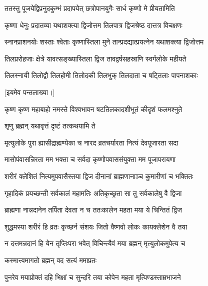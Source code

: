 \twolineshloka
{ततस्तु पूजयेद्विप्रनुदकुम्भं प्रदापयेत्}
{छत्रोपानयुगैः सार्ध कृष्णो मे प्रीयतामिति} %

\twolineshloka
{कृष्णा धेनुः प्रदातव्या यथाशक्त्या द्विजोत्तम}
{तिलपात्र द्विजश्रेष्ठ दात्तत्र विचक्षणः} %

\twolineshloka
{स्नानप्राशनयोः शस्ताः श्वेताः कृष्णास्तिला मुने}
{तान्प्रदद्यात्प्रयत्नेन यथाशक्त्या द्विजोत्तम} %

\twolineshloka
{तिलप्ररोहजाः क्षेत्रे यावत्सङ्ख्यास्तिला द्विज}
{तावद्वर्षसहस्राणि स्वर्गलोके महीयते} %

\twolineshloka
{तिलस्नायी तिलोद्वौ तिलहोमी तिलोदकी}
{तिलभुक् तिलदाता च षट्तिलाः पापनाशकाः} %

[इयमेव पन्तलाख्या।]


\twolineshloka
{कृष्ण कृष्ण महाबाहो नमस्ते विश्वभावन}
{षटतिलकादशीभूतं कीदृशं फलमश्नुते} %



\onelineshloka
{शृणु ब्रह्मन् यथावृत्तं दृष्टं तत्कथयामि ते} %

\twolineshloka
{मृत्युलोके पुरा ह्यासीद्राह्मण्येका च नारद}
{व्रतचर्यारता नित्यं देवपूजारता सदा} %

\twolineshloka
{मासोपंवासन्निरता मम भक्ता च सर्वदा}
{कृष्णोपवाससंयुक्ता मम पूजापरायणा} %

\twolineshloka
{शरीरं क्लेशितं नित्यमुपवासैस्तया द्विज}
{दीनानां ब्राह्मणानाञ्च कुमारीणां च भक्तितः} %

\twolineshloka
{गृहादिकं प्रयच्छन्ती सर्वकालं महामतिः}
{अतिकृच्छ्रता सा तु सर्वकालेषु वै द्विजा} %

\twolineshloka
{ब्राह्मणा नान्नदानेन तर्पिता देवता न च}
{ततःकालेन महता मया ये चिन्तितं द्विज} %

\twolineshloka
{शुद्धमस्या शरीरं हि व्रतः कृच्छर्न संशयः}
{जितो वैष्णवो लोकः कायक्लेशेन वै तया} %

\twolineshloka
{न दत्तमन्नदानं हि येन तृप्तिःपरा भवेत्}
{विचिन्त्यैवं मया ब्रह्मन् मृत्युलोकमुपेत्य च} %



\onelineshloka
{कस्मात्त्वमागतो ब्रह्मन् वद सत्यं ममाप्रतः} %

\twolineshloka
{पुनरेव मयाप्रोक्तं दहि भिक्षां च सुन्दरि}
{तया कोपेन महता मृत्पिण्डस्ताम्रभाजने} %

